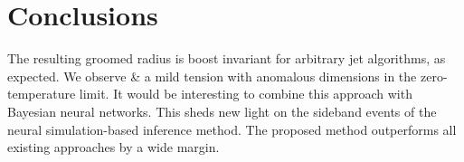 \section{Conclusions}\label{sec:conclusions}

The resulting groomed radius is boost invariant for arbitrary jet
algorithms, as expected. We observe & a mild tension with anomalous
dimensions in the zero-temperature limit. It would be interesting to
combine this approach with Bayesian neural networks. This sheds new
light on the sideband events of the neural simulation-based inference
method. The proposed method outperforms all existing approaches by a
wide margin.

